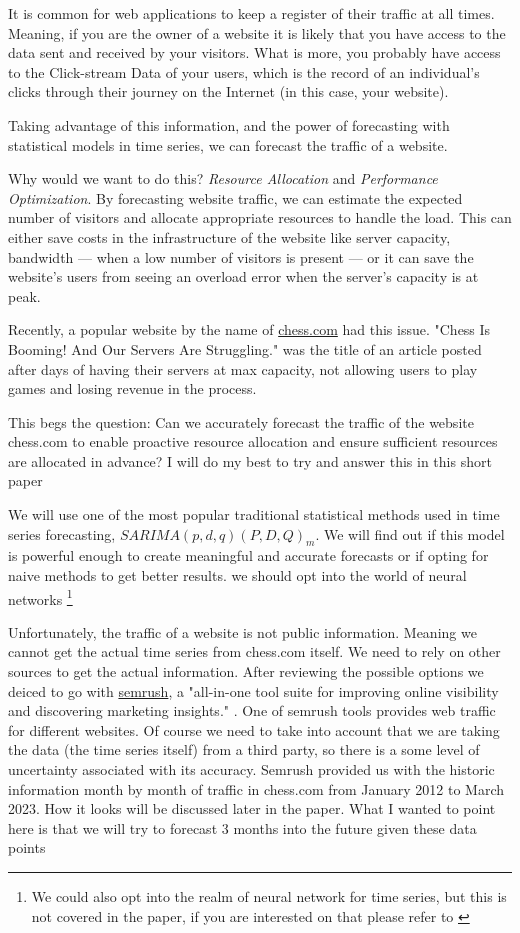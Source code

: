 \documentclass[journal]{IEEEtran}
\begin{document}
It is common for web applications to keep a register of their traffic at all
times. Meaning, if you are the owner of a website it is likely that you have
access to the data sent and received by your visitors. What is more, you
probably have access to the Click-stream Data of your users, which is the record
of an individual’s clicks through their journey on the Internet (in this case,
your website).

Taking advantage of this information, and the power of forecasting with
statistical models in time series, we can forecast the traffic of a website.

Why would we want to do this? \emph{Resource Allocation} and \emph{Performance
Optimization}. By forecasting website traffic, we can estimate the expected
number of visitors and allocate appropriate resources to handle the load. This
can either save costs in the infrastructure of the website like server
capacity, bandwidth --- when a low number of visitors is present --- or it can
save the website's users from seeing an overload error when the server's
capacity is at peak.

Recently, a popular website by the name of \href{https://chess.com}{chess.com}
had this issue.  "Chess Is Booming! And Our Servers Are Struggling."
\cite{chesscom} was the title of an article posted after days of having their
servers at max capacity, not allowing users to play games and losing revenue in
the process.

This begs the question: Can we accurately forecast the traffic of the website
chess.com to enable proactive resource allocation and ensure sufficient
resources are allocated in advance? I will do my best to try and answer this in
this short paper

We will use one of the most popular traditional statistical methods used in
time series forecasting, $SARIMA(p,d,q)(P,D,Q)_m$. We will find out if this
model is powerful enough to create meaningful and accurate forecasts or if
opting for naive methods to get better results.  we should opt into the world
of neural networks \footnote{We could also opt into the realm of neural network
for time series, but this is not covered in the paper, if you are interested
on that please refer to \cite{nn}}

Unfortunately, the traffic of a website is not public information. Meaning we
cannot get the actual time series from chess.com itself. We need to rely on
other sources to get the actual information. After reviewing the possible
options we deiced to go with  \href{http://semrush.com}{semrush}, a "all-in-one
tool suite for improving online visibility and discovering marketing insights."
\cite{semrush}. One of semrush tools provides web traffic for different
websites. Of course we need to take into account that we are taking the data
(the time series itself) from a third party, so there is a some level of
uncertainty associated with its accuracy. Semrush provided us with the historic
information month by month of traffic in chess.com from January 2012 to March
2023. How it looks will be discussed later in the paper. What I wanted to point
here is that we will try to forecast 3 months into the future given these data
points
\end{document}
